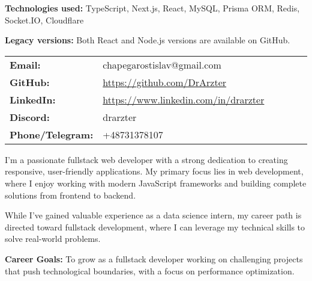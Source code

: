 \documentclass[10pt,a4paper,ragged2e,withhyper]{altacv}
\begin{document}
\begin{paracol}{2}
\begin{leftcolumn}
\textbf{Technologies used:} TypeScript, Next.js, React, MySQL, Prisma ORM, Redis, Socket.IO, Cloudflare

\textbf{Legacy versions:} Both React and Node.js versions are available on GitHub.

\end{leftcolumn}

\begin{rightcolumn}

  \begin{tabular}{p{0.3\linewidth} >{\raggedright\arraybackslash}p{0.7\linewidth}}
  \textbf{Email:}\hspace{0.5cm} & chapegarostislav@gmail.com \\
  \textbf{GitHub:}\hspace{0.5cm} & \url{https://github.com/DrArzter} \\
  \textbf{LinkedIn:}\hspace{0.5cm} & \url{https://www.linkedin.com/in/drarzter} \\
  \textbf{Discord:}\hspace{0.5cm} & drarzter \\
  \textbf{Phone/Telegram:}\hspace{0.5cm} & +48731378107
  \end{tabular}

\divider

I'm a passionate fullstack web developer with a strong dedication to creating responsive, user-friendly applications. My primary focus lies in web development, where I enjoy working with modern JavaScript frameworks and building complete solutions from frontend to backend. 

While I've gained valuable experience as a data science intern, my career path is directed toward fullstack development, where I can leverage my technical skills to solve real-world problems.

\textbf{Career Goals:} To grow as a fullstack developer working on challenging projects that push technological boundaries, with a focus on performance optimization.

\divider


\end{rightcolumn}
\end{paracol}
\end{document}
